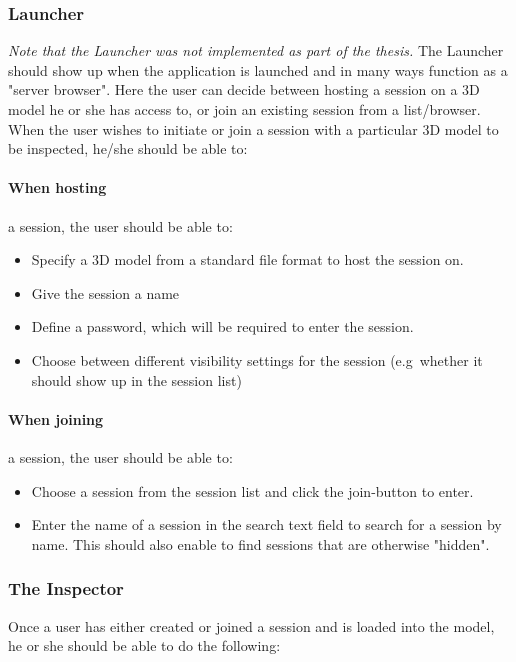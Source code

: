 \subsubsection{Launcher}
\textit{Note that the Launcher was not implemented as part of the thesis.}
The Launcher should show up when the application is launched and in many ways function as a "server browser".
Here the user can decide between hosting a session on a 3D model he or she has access to, or join an existing session from a list/browser.
When the user wishes to initiate or join a session with a particular 3D model to be inspected, he/she should be able to:

\paragraph{When hosting}a session, the user should be able to:
\begin{itemize}
	\item Specify a 3D model from a standard file format to host the session on.
	\item Give the session a name
	\item Define a password, which will be required to enter the session. 
	\item Choose between different visibility settings for the session (e.g~whether it should show up in the session list)
\end{itemize}

\paragraph{When joining}a session, the user  should be able to:
\begin{itemize}
	\item Choose a session from the session list and click the join-button to enter.
	\item Enter the name of a session in the search text field to search for a session by name.
			This should also enable to find sessions that are otherwise "hidden".
\end{itemize}	


\subsubsection{The Inspector}
Once a user has either created or joined a session and is loaded into the model, he or she should be able to do the following:

